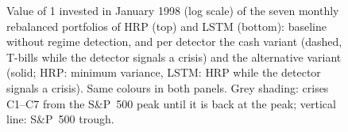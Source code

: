 \documentclass[12pt]{article}
\newcommand{\valuefile}{data_finalized/figure_value_hrp_lstm.csv}
\newcommand{\valuepanelheight}{4.5cm}
\newcommand{\valuepanel}[4]{%
    \renewcommand{\crisisymin}{0.7}%
    \renewcommand{\crisisymax}{25}%
    \begin{axis}[timechart, scale only axis, width=0.88\textwidth, height=\valuepanelheight,
                 ymode=log, ymin=0.7, ymax=25, ytick={1,2,5,10,20}, yticklabels={1,2,5,10,20},
                 ylabel={#2}, axis on top, ymajorgrids=false, clip mode=individual, #3]
        \crisesshade
        \crisislist\crisistrough
        #4
        \addlegendimage{regbase}
        \addplot[regcash=regCPcash]  table[x=date, y=#1_changepoint_cash] {\valuefile};
        \addplot[regcash=regCLcash]  table[x=date, y=#1_clustering_cash]  {\valuefile};
        \addplot[regcash=regHMMcash] table[x=date, y=#1_hmm_cash]         {\valuefile};
        \addlegendimage{empty legend}
        \addplot[regalt=regCP]       table[x=date, y=#1_changepoint_alt]  {\valuefile};
        \addplot[regalt=regCL]       table[x=date, y=#1_clustering_alt]   {\valuefile};
        \addplot[regalt=regHMM]      table[x=date, y=#1_hmm_alt]          {\valuefile};
        \addplot[regbase, forget plot] table[x=date, y=#1_baseline]       {\valuefile};
    \end{axis}%
}
\newcommand{\crisisymin}{0}
\newcommand{\crisisymax}{1}
\newcommand{\crisisshadecolor}{gray!25}
\newcommand{\crisislinecolor}{red}
\newcommand{\crisisshade}[3]{%
    \addplot[forget plot, draw=none, fill=\crisisshadecolor] coordinates {(#1,\crisisymin) (#3,\crisisymin) (#3,\crisisymax) (#1,\crisisymax)} --cycle;
}
\newcommand{\crisislist}[1]{%
    #1{1998-07-17}{1998-08-31}{1998-11-23}%
    #1{2000-03-24}{2002-10-09}{2007-05-30}%
    #1{2007-10-09}{2009-03-09}{2013-03-28}%
    #1{2018-09-20}{2018-12-24}{2019-04-23}%
    #1{2020-02-19}{2020-03-23}{2020-08-18}%
    #1{2022-01-03}{2022-10-12}{2024-01-19}%
    #1{2025-02-19}{2025-04-08}{2025-06-27}%
}
\newcommand{\crisistrough}[3]{%
    \addplot[forget plot, \crisislinecolor, line width=0.4pt, mark=none] coordinates {(#2,\crisisymin) (#2,\crisisymax)};
}
\newcounter{crisisno}
\newcommand{\crisislabel}[3]{%
    \stepcounter{crisisno}%
    \edef\crisislabelnode{\noexpand\node[anchor=south, inner sep=1.5pt, font=\noexpand\scriptsize]
        at (axis cs:#2,\crisisymax) {C\arabic{crisisno}};}%
    \crisislabelnode
}
\newcommand{\crisislabels}{\setcounter{crisisno}{0}\crisislist\crisislabel}
\newcommand{\crisesshade}{\crisislist\crisisshade}
\begin{document}
\begin{figure}[htbp]
    \centering
    \caption{Value of 1 invested in January 1998 (log scale) of the seven monthly rebalanced portfolios of HRP (top) and LSTM (bottom): baseline without regime detection, and per detector the cash variant (dashed, T-bills while the detector signals a crisis) and the alternative variant (solid; HRP: minimum variance, LSTM: HRP while the detector signals a crisis). Same colours in both panels. Grey shading: crises C1--C7 from the S\&P~500 peak until it is back at the peak; vertical line: S\&P~500 trough.}
    \label{fig:value_hrp_lstm}
\end{figure}
\end{document}

